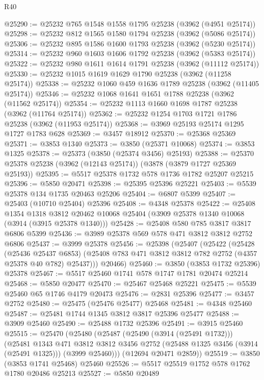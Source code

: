 \begin{lexlean}{R40}
\begin{coremodule}
@25290 := @25232 @765 @1548 @1558 @1795 @25238 (@3962 (@4951 @25174))
@25298 := @25232 @812 @1565 @1580 @1794 @25238 (@3962 (@5086 @25174))
@25306 := @25232 @895 @1586 @1600 @1793 @25238 (@3962 (@5230 @25174))
@25314 := @25232 @960 @1603 @1606 @1792 @25238 (@3962 (@5383 @25174))
@25322 := @25232 @980 @1611 @1614 @1791 @25238 (@3962 (@11112 @25174))
@25330 := @25232 @1015 @1619 @1629 @1790 @25238 (@3962 (@11258 @25174))
@25338 := @25232 @1060 @459 @1636 @1789 @25238 (@3962 (@11405 @25174))
@25346 := @25232 @1068 @1641 @1651 @1788 @25238 (@3962 (@11562 @25174))
@25354 := @25232 @1113 @1660 @1698 @1787 @25238 (@3962 (@11764 @25174))
@25362 := @25232 @1254 @1703 @1721 @1786 @25238 (@3962 (@11953 @25174))
@25368 := @3969 @25193 @25174 @1295 @1727 @1783 @628
@25369 := @3457 @18912
@25370 := @25368 @25369
@25371 := @3853 @1340
@25373 := @3850 (@25371 @10068)
@25374 := @3853 @1325
@25378 := @25373 (@3850 (@25374 @3456) @25193)
@25388 := @25370 @25378 @25238 (@3962 (@12143 @25174)) (@3878 (@3879 @1727 @25369 @25193))
@25395 := @5517 @25378 @1732 @578 @1736 @1782 @25207 @25215
@25396 := @5850 @20471
@25398 := @25395 @25396 @25221
@25403 := @5539 @25378 @134 @1735 @20463 @25206
@25404 := @6807 @5399
@25407 := @25403 (@10710 @25404) @25396
@25408 := @4348 @25378
@25422 := @25408
    @1354
    @1318
    @3812
    @20462
    @10068
    @25404
    (@3909 @25378 @1340 @10068 (@3914 (@3915 @25378 @1340)))
@25428 := @25408 @580 @785 @3817 @3817 @6806 @5399
@25436 := @3989 @25378 @569 @578 @471 @3812 @3812 @2752 @6806
@25437 := @3999 @25378
@25456 := @25398
    (@25407
      (@25422
        (@25428
          (@25436 @25437 @6853)
          (@25408 @783 @471 @3812 @3812 @782 @2752 (@4357 @25378 @40 @782) @25437)))
      @20466)
@25460 := @3850 (@3853 @1732 @25396) @25378
@25467 := @5517 @25460 @1741 @578 @1747 @1781 @20474 @25214
@25468 := @5850 @20477
@25470 := @25467 @25468 @25221
@25475 := @5539 @25460 @65 @1746 @4179 @20473
@25476 := @2831 @25396
@25477 := @3457 @2752
@25480 := @25475 (@25476 @25477) @25468
@25481 := @4348 @25460
@25487 := @25481 @1744 @1345 @3812 @3817 @25396 @25477
@25488 := @3909 @25460
@25490 := @25488 @1732 @25396
@25491 := @3915 @25460
@25515 := @25470
    (@25480
      (@25487
        (@25490 (@3914 (@25491 @1732)))
        (@25481
          @1343
          @471
          @3812
          @3812
          @3456
          @2752
          (@25488 @1325 @3456 (@3914 (@25491 @1325)))
          (@3999 @25460)))
      (@12694 @20471 @2859))
@25519 := @3850 (@3853 @1741 @25468) @25460
@25526 := @5517 @25519 @1752 @578 @1762 @1780 @20486 @25213
@25527 := @5850 @20489

\end{coremodule}
\end{lexlean}
